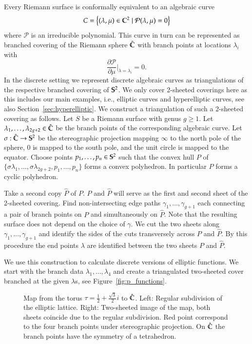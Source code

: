\documentclass[Thesis]{subfiles}
\begin{document}
Every Riemann surface is conformally equivalent to an algebraic curve
\[C=\left\{(\lambda,\mu)\in \C^2 \mid \mathcal P(\lambda,\mu)=0\right\}\]
where $\mathcal P$ is an irreducible polynomial.
This curve in turn can be represented as branched covering of the Riemann sphere $\hat{\C}$ with branch points at locations $\lambda_i$ with \[\frac{\partial\mathcal P}{\partial \mu}\Bigr|_{\lambda=\lambda_i} = 0.\]
In the discrete setting we represent discrete algebraic curves as triangulations of the respective branched covering of $\S^2$.
We only cover 2-sheeted coverings here as this includes our main examples, i.e., elliptic curves and hyperelliptic curves, see also Section~\ref{sec:hyperelliptic}.
We construct a triangulation of such a 2-sheeted covering as follows.
Let $S$ be a Riemann surface with genus $g\geq 1$.
Let $\lambda_1,\ldots,\lambda_{2g+2}\in \hat\C$ be the branch points of the corresponding algebraic curve.
Let $\sigma :\hat\C\to\S^2$ be the stereographic projection mapping $\infty$ to the north pole of the sphere, $0$ is mapped to the south pole, and the unit circle is mapped to the equator.
Choose points $p_1,\ldots,p_n\in\S^2$ such that the convex hull $P$ of $\{\sigma\lambda_1,\ldots,\sigma\lambda_{2g+2},p_1,\ldots,p_n\}$ forms a convex polyhedron.
In particular $P$ forms a cyclic polyhedron.

Take a second copy $\hat P$ of $P$. $P$ and $\hat P$ will serve as the first and second sheet of the 2-sheeted covering.
Find non-intersecting edge paths $\gamma_1,\ldots,\gamma_{g+1}$ each connecting a pair of branch points on $P$ and simultaneously on $\hat P$.
Note that the resulting surface does not depend on the choice of $\gamma$.
We cut the two sheets along $\gamma_1,\ldots,\gamma_{g+1}$ and identify the sides of the cuts transversely across $P$ and $\hat P$.
By this procedure the end points $\lambda$ are identified between the two sheets $P$ and $\hat P$.

We use this construction to calculate discrete versions of elliptic functions.
We start with the branch data $\lambda_1,\ldots,\lambda_{4}$ and create a triangulated two-sheeted cover branched at the given $\lambda$s, see Figure~\ref{fig:p_functions}.


\begin{figure}
\centering
{}
\caption{
Map from the torus $\tau=\frac{1}{2}+\frac{\sqrt 3}{2}i$ to $\Chat$. 
Left: Regular subdivision of the elliptic lattice. 
Right: Two-sheeted image of the map, both sheets coincide due to the regular subdivision. 
Red point correspond to the four branch points under stereographic projection.
On $\Chat$ the branch points have the symmetry of a tetrahedron.
} 
\label{fig:wente_elliptic}
\end{figure}
\end{document}
